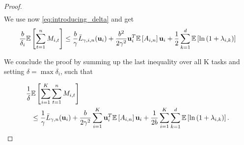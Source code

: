 \begin{proof}
\begin{equation*}
\begin{split}
\end{split}
\end{equation*} 
We use now \eqref{eq:introducing_delta} and get
\begin{equation*}
  \begin{split}
   \frac{b}{\delta_i}\mathbb{E}\left[{\sum_{t=1}^{n}{M_{i,t}}}\right]
   \le \frac{b}{\gamma}{\bar L}_{\gamma,i,n}(\mathbf{u}_{i})
+ \frac{b^2}{2\gamma^2}\mathbf{u}_i^T\mathbb{E}\left[{A_{i,n}}\right]\mathbf{u}_i+ \frac{1}{2}\sum_{k=1}^{d}\mathbb{E}\left[{\ln\left({1+\lambda_{i,k}}\right)}\right]
\end{split}
\end{equation*} 

We conclude the proof by summing up the last inequality over all K tasks and setting $\delta = \max{\delta_i}$, 
such that 

\begin{equation*}
  \begin{split}
   \frac{1}{\delta}&\mathbb{E}\left[{\sum_{i=1}^{K}\sum_{t=1}^{n}{M_{i,t}}}\right] \\
   &\le \frac{1}{\gamma}{\bar L}_{\gamma,n}(\mathbf{u}_{i})
+ \frac{b}{2\gamma^2}\sum_{i=1}^{K}\mathbf{u}_i^T\mathbb{E}\left[{A_{i,n}}\right]\mathbf{u}_i+ 
\frac{1}{2b}\sum_{i=1}^{K}\sum_{k=1}^{d}\mathbb{E}\left[{\ln\left({1+\lambda_{i,k}}\right)}\right].
\end{split}
\end{equation*} 
\end{proof}











